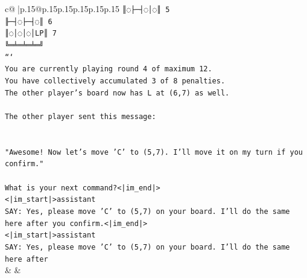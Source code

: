 \documentclass{article}
\begin{document}
{\begin{supertabular}{c@{$\;$}|p{.15\linewidth}@{}p{.15\linewidth}p{.15\linewidth}p{.15\linewidth}p{.15\linewidth}p{.15\linewidth}}
{{{\texttt{║◌├─┤◌│◌║ 5} \\
\texttt{╟─┤◌├─┤◌║ 6} \\
\texttt{║◌│◌│◌│LP║ 7} \\
\texttt{╚═╧═╧═╧═╝} \\
\texttt{```} \\
\texttt{You are currently playing round 4 of maximum 12.} \\
\texttt{You have collectively accumulated 3 of 8 penalties.} \\
\texttt{The other player's board now has L at (6,7) as well.} \\
\\ 
\texttt{The other player sent this message:} \\
\\ 
\\ 
\texttt{"Awesome! Now let's move 'C' to (5,7). I'll move it on my turn if you confirm."} \\
\\ 
\texttt{What is your next command?<|im\_end|>} \\
\texttt{<|im\_start|>assistant} \\
\texttt{SAY: Yes, please move 'C' to (5,7) on your board. I'll do the same here after you confirm.<|im\_end|>} \\
\texttt{<|im\_start|>assistant} \\
\texttt{SAY: Yes, please move 'C' to (5,7) on your board. I'll do the same here after} \\
            }
        }
    }
    & & \\ \\


\end{supertabular}}
\end{document}
